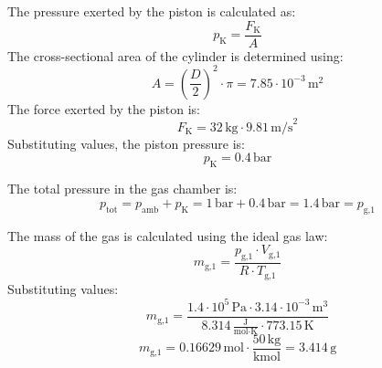 The pressure exerted by the piston is calculated as:  
\[
p_{\text{K}} = \frac{F_{\text{K}}}{A}
\]  
The cross-sectional area of the cylinder is determined using:  
\[
A = \left(\frac{D}{2}\right)^2 \cdot \pi = 7.85 \cdot 10^{-3} \, \text{m}^2
\]  
The force exerted by the piston is:  
\[
F_{\text{K}} = 32 \, \text{kg} \cdot 9.81 \, \text{m/s}^2
\]  
Substituting values, the piston pressure is:  
\[
p_{\text{K}} = 0.4 \, \text{bar}
\]  

The total pressure in the gas chamber is:  
\[
p_{\text{tot}} = p_{\text{amb}} + p_{\text{K}} = 1 \, \text{bar} + 0.4 \, \text{bar} = 1.4 \, \text{bar} = p_{\text{g,1}}
\]  

The mass of the gas is calculated using the ideal gas law:  
\[
m_{\text{g,1}} = \frac{p_{\text{g,1}} \cdot V_{\text{g,1}}}{R \cdot T_{\text{g,1}}}
\]  
Substituting values:  
\[
m_{\text{g,1}} = \frac{1.4 \cdot 10^5 \, \text{Pa} \cdot 3.14 \cdot 10^{-3} \, \text{m}^3}{8.314 \, \frac{\text{J}}{\text{mol·K}} \cdot 773.15 \, \text{K}}
\]  
\[
m_{\text{g,1}} = 0.16629 \, \text{mol} \cdot \frac{50 \, \text{kg}}{\text{kmol}} = 3.414 \, \text{g}
\]